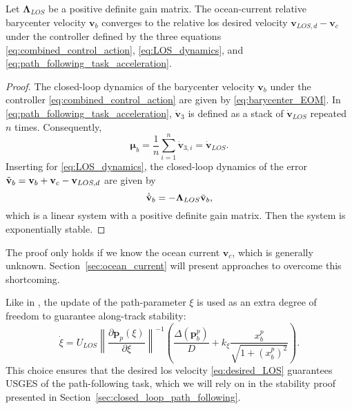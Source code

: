 \begin{lemma}\label{lemma:LOS_controller_lemma}
    Let $\mathbf{\Lambda}_{LOS}$ be a positive definite gain matrix. The ocean-current relative barycenter velocity $\mathbf{v}_b$ converges to the relative \gls{los} desired velocity $\mathbf{v}_{LOS,d} - \mathbf{v}_c$ under the controller defined by the three equations \eqref{eq:combined_control_action}, \eqref{eq:LOS_dynamics}, and \eqref{eq:path_following_task_acceleration}.
\end{lemma}
\begin{proof}
    The closed-loop dynamics of the barycenter velocity $\mathbf{v}_b$ under the controller \eqref{eq:combined_control_action} are given by \eqref{eq:barycenter_EOM}. In \eqref{eq:path_following_task_acceleration}, $\dot{\mathbf{v}}_3$ is defined as a stack of $\dot{\mathbf{v}}_{LOS}$ repeated $n$ times. Consequently,
    \begin{equation}
        \bm{\mu}_b = \frac{1}{n}\sum_{i=1}^n \dot{\mathbf{v}}_{3,i} = \dot{\mathbf{v}}_{LOS}.
    \end{equation}
    Inserting for \eqref{eq:LOS_dynamics}, the closed-loop dynamics of the error $\Tilde{\mathbf{v}}_b = \mathbf{v}_b + \mathbf{v}_c - \mathbf{v}_{LOS,d}$ are given by
    \begin{equation}
        \dot{\Tilde{\mathbf{v}}}_b = -\mathbf{\Lambda}_{LOS} \Tilde{\mathbf{v}}_b,
    \end{equation}
    which is a linear system with a positive definite gain matrix. Then the system is exponentially stable.
\end{proof}

The proof only holds if we know the ocean current $\mathbf{v}_c$, which is generally unknown. Section~\ref{sec:ocean_current} will present approaches to overcome this shortcoming. 

Like in \cite{matous_singularity-free_2022}, the update of the path-parameter $\xi$ is used as an extra degree of freedom to guarantee along-track stability:
\begin{equation}\label{eq:path_update}
    \dot{\xi} = U_{LOS}\left \| \frac{\partial \mathbf{p}_p(\xi)}{\partial \xi}\right \|^{-1} \left (\frac{\Delta(\mathbf{p}_b^p)}{D} +  k_\xi\frac{x_b^p}{\sqrt{1 + (x_b^p)^2}} \right ).
\end{equation}
This choice ensures that the desired \gls{los} velocity \eqref{eq:desired_LOS} guarantees USGES of the path-following task, which we will rely on in the stability proof presented in Section~\ref{sec:closed_loop_path_following}.


